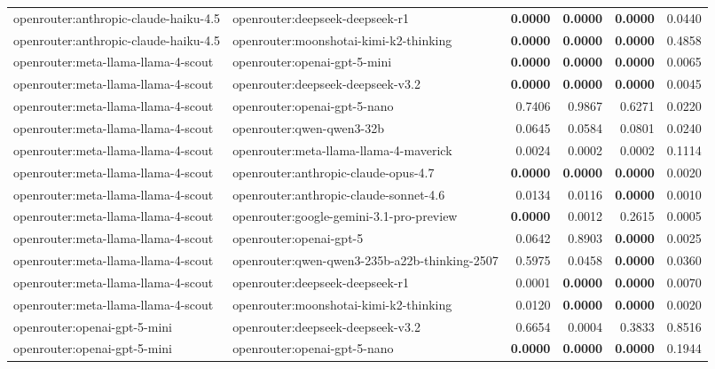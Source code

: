 \begin{table}[t]
\begin{tabular}{llrrrr}
openrouter:anthropic-claude-haiku-4.5 & openrouter:deepseek-deepseek-r1 & \textbf{0.0000} & \textbf{0.0000} & \textbf{0.0000} & 0.0440 \\
openrouter:anthropic-claude-haiku-4.5 & openrouter:moonshotai-kimi-k2-thinking & \textbf{0.0000} & \textbf{0.0000} & \textbf{0.0000} & 0.4858 \\
openrouter:meta-llama-llama-4-scout & openrouter:openai-gpt-5-mini & \textbf{0.0000} & \textbf{0.0000} & \textbf{0.0000} & 0.0065 \\
openrouter:meta-llama-llama-4-scout & openrouter:deepseek-deepseek-v3.2 & \textbf{0.0000} & \textbf{0.0000} & \textbf{0.0000} & 0.0045 \\
openrouter:meta-llama-llama-4-scout & openrouter:openai-gpt-5-nano & 0.7406 & 0.9867 & 0.6271 & 0.0220 \\
openrouter:meta-llama-llama-4-scout & openrouter:qwen-qwen3-32b & 0.0645 & 0.0584 & 0.0801 & 0.0240 \\
openrouter:meta-llama-llama-4-scout & openrouter:meta-llama-llama-4-maverick & 0.0024 & 0.0002 & 0.0002 & 0.1114 \\
openrouter:meta-llama-llama-4-scout & openrouter:anthropic-claude-opus-4.7 & \textbf{0.0000} & \textbf{0.0000} & \textbf{0.0000} & 0.0020 \\
openrouter:meta-llama-llama-4-scout & openrouter:anthropic-claude-sonnet-4.6 & 0.0134 & 0.0116 & \textbf{0.0000} & 0.0010 \\
openrouter:meta-llama-llama-4-scout & openrouter:google-gemini-3.1-pro-preview & \textbf{0.0000} & 0.0012 & 0.2615 & 0.0005 \\
openrouter:meta-llama-llama-4-scout & openrouter:openai-gpt-5 & 0.0642 & 0.8903 & \textbf{0.0000} & 0.0025 \\
openrouter:meta-llama-llama-4-scout & openrouter:qwen-qwen3-235b-a22b-thinking-2507 & 0.5975 & 0.0458 & \textbf{0.0000} & 0.0360 \\
openrouter:meta-llama-llama-4-scout & openrouter:deepseek-deepseek-r1 & 0.0001 & \textbf{0.0000} & \textbf{0.0000} & 0.0070 \\
openrouter:meta-llama-llama-4-scout & openrouter:moonshotai-kimi-k2-thinking & 0.0120 & \textbf{0.0000} & \textbf{0.0000} & 0.0020 \\
openrouter:openai-gpt-5-mini & openrouter:deepseek-deepseek-v3.2 & 0.6654 & 0.0004 & 0.3833 & 0.8516 \\
openrouter:openai-gpt-5-mini & openrouter:openai-gpt-5-nano & \textbf{0.0000} & \textbf{0.0000} & \textbf{0.0000} & 0.1944 \\

\end{tabular}
\end{table}
